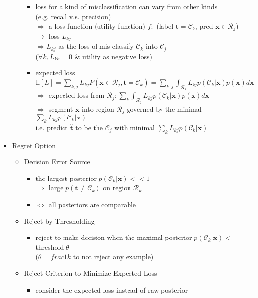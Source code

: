 \begin{itemize}
\begin{itemize}
\begin{itemize}
		\item loss for a kind of misclassification can vary from other kinds \\
		(e.g. recall v.s. precision) \\
		$\Rightarrow$ a loss function (utility function) $f:$ (label $\mathbf t=\mathcal C_k$, pred ${\mathbf x}\in\mathcal R_j$) $\rightarrow $ loss $L_{kj}$ \\
		$\Rightarrow L_{kj}$ as the loss of mis-classify $\mathcal C_k$ into $\mathcal C_j$ \\
		($\forall k, L_{kk}=0$ \& utility as negative loss)
		\item expected loss $\displaystyle \mathbb E[L] = \sum_{k,j}L_{kj}P(\mathbf x\in \mathcal R_{j}, \mathbf t=\mathcal C_k) = \sum_{k,j}\int_{\mathcal R_j}L_{kj} p(\mathcal C_k|\mathbf x)p(\mathbf x)d\mathbf x$ \\
		$\Rightarrow$ expected loss from $\displaystyle \mathcal R_j: \sum_k \int_{\mathcal R_j}L_{kj} p(\mathcal C_k|\mathbf x)p(\mathbf x) d\mathbf x$ \\
		$\Rightarrow$ segment $\mathbf x$ into region $\mathcal R_j$ governed by the minimal $\displaystyle \sum_{k}L_{kj}p(\mathcal C_k|\mathbf x)$ \\
		i.e. predict $\hat{\mathbf t}$ to be the $\mathcal C_j$ with minimal $\displaystyle \sum_{k}L_{kj}p(\mathcal C_k|\mathbf x)$
		\end{itemize}
	\end{itemize}
\item Regret Option
	\begin{itemize}
	\item Decision Error Source
		\begin{itemize}
		\item the largest posterior $p(\mathcal C_k|\mathbf x) << 1$ \\
		$\Rightarrow$ large $p(\mathbf t \neq \mathcal C_k)$ on region $\mathcal R_k$
		\item $\Leftrightarrow$ all posteriors are comparable
		\end{itemize}
	\item Reject by Thresholding
		\begin{itemize}
		\item reject to make decision when the maximal posterior $p(\mathcal C_k|\mathbf x) <$ threshold $\theta$ \\
		($\theta=frac 1 k$ to not reject any example)
		\end{itemize}
	\item Reject Criterion to Minimize Expected Loss
		\begin{itemize}
		\item consider the expected loss instead of raw posterior
		\end{itemize}
	\end{itemize}
\end{itemize}

